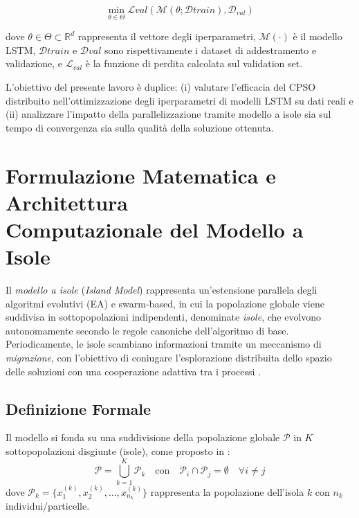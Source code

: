 \documentclass{article}
\begin{document}
\begin{equation}
\min_{\theta \in \Theta} \mathcal{L}{val}(\mathcal{M}(\theta; \mathcal{D}{train}), \mathcal{D}_{val})
\end{equation}

dove $\theta \in \Theta \subset \mathbb{R}^d$ rappresenta il vettore degli iperparametri, $\mathcal{M}(\cdot)$ è il 
modello LSTM, $\mathcal{D}{train}$ e $\mathcal{D}{val}$ sono rispettivamente i dataset di addestramento e 
validazione, e $\mathcal{L}_{val}$ è la funzione di perdita calcolata sul validation set.

L’obiettivo del presente lavoro è duplice: (i) valutare l’efficacia del CPSO distribuito nell’ottimizzazione degli 
iperparametri di modelli LSTM su dati reali e (ii) analizzare l’impatto della parallelizzazione tramite modello a 
isole sia sul tempo di convergenza sia sulla qualità della soluzione ottenuta.

\section{Formulazione Matematica e Architettura \\Computazionale del Modello a Isole}

Il \textit{modello a isole} (\textit{Island Model}) rappresenta un'estensione parallela degli algoritmi 
evolutivi (EA) e swarm-based, in cui la popolazione globale viene suddivisa in sottopopolazioni 
indipendenti, denominate \textit{isole}, che evolvono autonomamente secondo le regole canoniche 
dell'algoritmo di base. Periodicamente, le isole scambiano informazioni tramite un meccanismo di 
\textit{migrazione}, con l’obiettivo di coniugare l'esplorazione distribuita dello spazio delle soluzioni 
con una cooperazione adattiva tra i processi \cite{tomassini2005spatially, cantupaz1998survey}.

\subsection{Definizione Formale}

Il modello si fonda su una suddivisione della popolazione globale $\mathcal{P}$ in $K$ sottopopolazioni 
disgiunte (isole), come proposto in \cite{alba2002parallelism, tomassini2005spatially}:
\[
\mathcal{P} = \bigcup_{k=1}^K \mathcal{P}_k \quad \text{con} \quad \mathcal{P}_i \cap \mathcal{P}_j = \emptyset \quad \forall i \neq j
\]
dove $\mathcal{P}_k = \{x_1^{(k)}, x_2^{(k)}, \dots, x_{n_k}^{(k)}\}$ rappresenta la popolazione dell'isola $k$ con $n_k$ individui/particelle.
\end{document}
